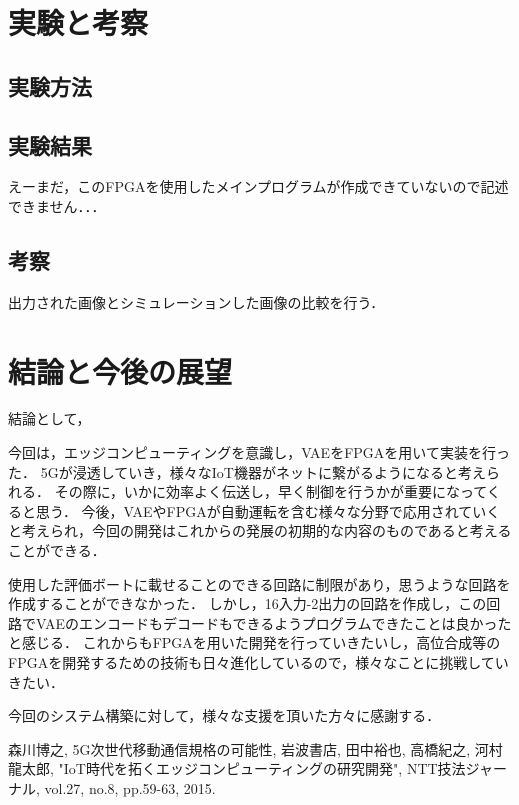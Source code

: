 \documentclass[paper]{ieicej}
\begin{document}
\section{実験と考察}
\subsection{実験方法}

\subsection{実験結果}
えーまだ，このFPGAを使用したメインプログラムが作成できていないので記述できません．．．

\subsection{考察}
出力された画像とシミュレーションした画像の比較を行う．

\section{結論と今後の展望}
結論として，

今回は，エッジコンピューティングを意識し，VAEをFPGAを用いて実装を行った．
5Gが浸透していき，様々なIoT機器がネットに繋がるようになると考えられる．
その際に，いかに効率よく伝送し，早く制御を行うかが重要になってくると思う．
今後，VAEやFPGAが自動運転を含む様々な分野で応用されていくと考えられ，今回の開発はこれからの発展の初期的な内容のものであると考えることができる．

使用した評価ボートに載せることのできる回路に制限があり，思うような回路を作成することができなかった．
しかし，16入力-2出力の回路を作成し，この回路でVAEのエンコードもデコードもできるようプログラムできたことは良かったと感じる．
これからもFPGAを用いた開発を行っていきたいし，高位合成等のFPGAを開発するための技術も日々進化しているので，様々なことに挑戦していきたい．

\ack
今回のシステム構築に対して，様々な支援を頂いた方々に感謝する．
%
%
\begin{thebibliography}{99}%
森川博之, 5G次世代移動通信規格の可能性, 岩波書店, 
田中裕也, 高橋紀之, 河村龍太郎, "IoT時代を拓くエッジコンピューティングの研究開発", NTT技法ジャーナル, vol.27, no.8, pp.59-63, 2015.
\end{thebibliography}
\end{document}
